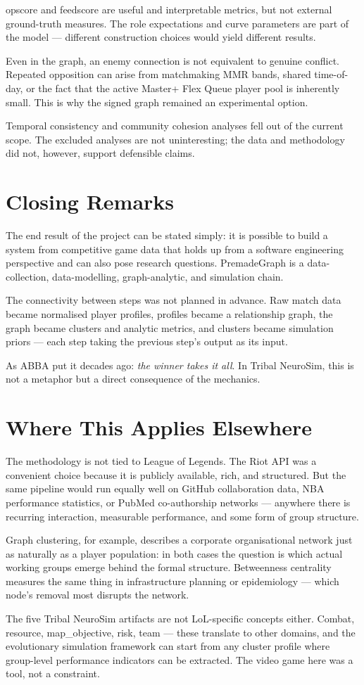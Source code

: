 opscore and feedscore are useful and interpretable metrics, but not external ground-truth measures. The role expectations and curve parameters are part of the model --- different construction choices would yield different results.

Even in the graph, an enemy connection is not equivalent to genuine conflict. Repeated opposition can arise from matchmaking MMR bands, shared time-of-day, or the fact that the active Master+ Flex Queue player pool is inherently small. This is why the signed graph remained an experimental option.

Temporal consistency and community cohesion analyses fell out of the current scope. The excluded analyses are not uninteresting; the data and methodology did not, however, support defensible claims.

\section{Closing Remarks}

The end result of the project can be stated simply: it is possible to build a system from competitive game data that holds up from a software engineering perspective and can also pose research questions. PremadeGraph is a data-collection, data-modelling, graph-analytic, and simulation chain.

The connectivity between steps was not planned in advance. Raw match data became normalised player profiles, profiles became a relationship graph, the graph became clusters and analytic metrics, and clusters became simulation priors --- each step taking the previous step's output as its input.

As ABBA put it decades ago: \textit{the winner takes it all}.
In Tribal NeuroSim, this is not a metaphor but a direct consequence of the mechanics.

\section{Where This Applies Elsewhere}
\label{sec:osszegzes-transfer}

The methodology is not tied to League of Legends. The Riot API was a convenient choice because it is publicly available, rich, and structured. But the same pipeline would run equally well on GitHub collaboration data, NBA performance statistics, or PubMed co-authorship networks --- anywhere there is recurring interaction, measurable performance, and some form of group structure.

Graph clustering, for example, describes a corporate organisational network just as naturally as a player population: in both cases the question is which actual working groups emerge behind the formal structure. Betweenness centrality measures the same thing in infrastructure planning or epidemiology --- which node's removal most disrupts the network.

The five Tribal NeuroSim artifacts are not LoL-specific concepts either. Combat, resource, map\_objective, risk, team --- these translate to other domains, and the evolutionary simulation framework can start from any cluster profile where group-level performance indicators can be extracted. The video game here was a tool, not a constraint.
